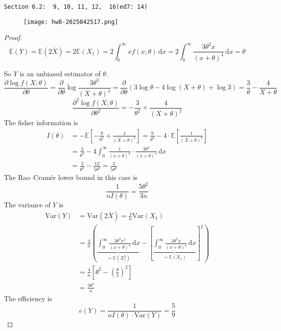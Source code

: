 \begin{lstlisting}
Section 6.2:  9, 10, 11, 12,  16(ed7: 14)
\end{lstlisting}
\begin{exercise}
\begin{figure}[H]
\centering
\texttt{[image: hw8-2025042517.png]}
\label{}
\end{figure}
\end{exercise}
\begin{proof}
\begin{equation}
\mathbb{E}(Y)=\mathbb{E}(2\overline{X})=2\mathbb{E}(X_1)=2\int_{0}^{\infty} xf(x;\theta) \, \mathrm{d}x =2\int_{0}^{\infty} \frac{3\theta^{3}x}{(x+\theta)^{4}} \, \mathrm{d}x =\theta
\label{c462b0}
\end{equation}

So $Y$ is an unbiased estimator of $\theta$.
\[
\frac{ \partial \log f(X;\theta) }{ \partial \theta }=\frac{ \partial   }{ \partial \theta } \log \frac{3\theta^{3}}{(X+\theta)^{4}}=\frac{ \partial   }{ \partial \theta } (3\log\theta-4\log(X+\theta)+\log3)=\frac{3}{\theta}-\frac{4}{X+\theta}
\]
\[
\frac{ \partial^2 \log f(X;\theta) }{ \partial \theta ^2 } =-\frac{3}{\theta^{2}}+\frac{4}{(X+\theta)^2}
\]
The fisher information is
\[
\begin{aligned}
I(\theta) & =-\mathbb{E}\left[ -\frac{9}{\theta^{2}}+\frac{4}{(X+\theta)^2} \right]=\frac{9}{\theta^{2}}-4\cdot \mathbb{E}\left[ \frac{1}{(X+\theta)^2} \right] \\
 & =\frac{3}{\theta^{2}}-4\int_{0}^{\infty} \frac{1}{(x+\theta)^2}\cdot\frac{3\theta^{3}}{(x+\theta)^{4}} \, \mathrm{d}x  \\
 & =\frac{3}{\theta^{2}}-\frac{12}{5\theta^{2}}=\frac{3}{5\theta^{2}}
\end{aligned}
\]
The Rao–Cramér lower bound in this case is
\[
\frac{1}{nI(\theta)}=\frac{5\theta^{2}}{3n}
\]
The variance of $Y$ is
\[
\begin{aligned}
\mathrm{Var}(Y) & =\mathrm{Var}(2\overline{X})=\frac{4}{n}\mathrm{Var}(X_1) \\
 & =\frac{4}{n}\left( \underbrace{ \int_{0}^{\infty} \frac{3\theta^{3}x^2}{(x+\theta)^{4}} \, \mathrm{d}x }_{ =\mathbb{E}(X_1^2) } -\left[ \underbrace{ \int_{0}^{\infty} \frac{3\theta^{3}x}{(x+\theta)^{4}} \, \mathrm{d}x }_{ =\mathbb{E}(X_1) } \right]^2 \right)  \\
 & =\frac{4}{n}\left[ \theta^{2}-\left( \frac{\theta}{2} \right)^2 \right] \\
 & =\frac{3\theta^{2}}{n}
\end{aligned}
\]
The efficiency is
\[
e(Y)=\frac{1}{nI(\theta)\cdot \mathrm{Var}(Y)}=\frac{5}{9} 
\]
\end{proof}


